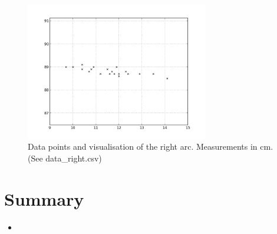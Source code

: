 \documentclass{scrartcl}
\begin{document}
\begin{figure}[h]
\centering
\begin{minipage}{.5\textwidth}
  \centering
\end{minipage}%
\begin{minipage}{.5\textwidth}
  \centering
   \includegraphics[width= 8cm]{img/data_right.png}  
\end{minipage}
\caption{Data points and visualisation of the right arc. Measurements in cm. (See data\_right.csv)}
\label{fig:data_left}
\end{figure}
 
\section{Summary}
\begin{itemize}
\item
\end{itemize}








%




\end{document}
